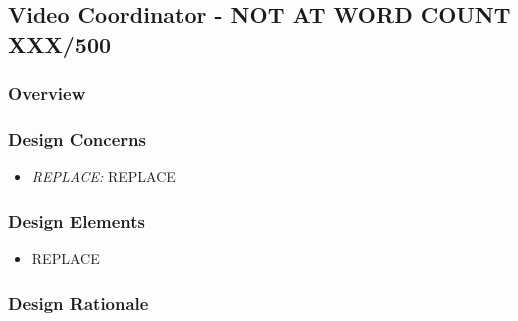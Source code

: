 \subsection{Video Coordinator - NOT AT WORD COUNT XXX/500}
\subsubsection{Overview}

\subsubsection{Design Concerns}
\begin{itemize}
\item \textit{REPLACE:} REPLACE

\end{itemize}

\subsubsection{Design Elements}
\begin{itemize}
\item REPLACE
\end{itemize}

\subsubsection{Design Rationale}
